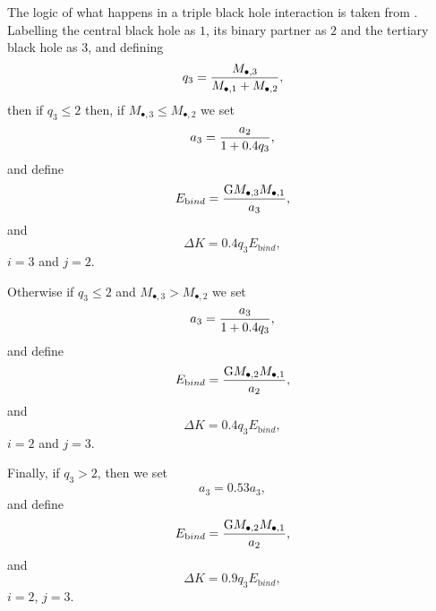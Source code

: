 The logic of what happens in a triple black hole interaction is taken from \cite{volonteri_assembly_2003}. Labelling the central black hole as $1$, its binary partner as $2$ and the tertiary black hole as $3$, and defining
\begin{equation}
q_3 = {M_{\bullet, 3} \over M_{\bullet, 1} + M_{\mathrm \bullet, 2} },
\end{equation}
then if $q_3 \le 2$ then, if $M_{\bullet, 3} \le M_{\mathrm \bullet, 2}$ we set
\begin{equation}
a_3 = {a_2 \over 1 + 0.4 q_3}, 
\end{equation}
and define
\begin{equation}
E_{\mathrm bind} = {{\mathrm G} M_{\bullet, 3} M_{\bullet, 1} \over a_3},
\end{equation}
and
\begin{equation}
\Delta K =0.4 q_3 E_{\mathrm bind},
\end{equation}
$i=3$ and $j=2$. 

Otherwise if $q_3 \le 2$ and $M_{\bullet, 3} > M_{\mathrm \bullet, 2}$ we set
\begin{equation}
a_3 = { a_3 \over 1 +0.4 q_3},
\end{equation}
and define
\begin{equation}
E_{\mathrm bind} = {{\mathrm G} M_{\bullet, 2} M_{\bullet, 1} \over a_2},
\end{equation}
and
\begin{equation}
 \Delta K =0.4 q_3 E_{\mathrm bind},
\end{equation}
$i=2$ and $j=3$.

Finally, if $q_3 > 2$, then we set
\begin{equation}
a_3 =0.53 a_3,
\end{equation}
and define
\begin{equation}
E_{\mathrm bind} = {{\mathrm G} M_{\bullet, 2} M_{\bullet, 1} \over a_2},
\end{equation}
and
\begin{equation}
\Delta K =0.9 q_3 E_{\mathrm bind},
\end{equation}
$i=2$, $j=3$.

